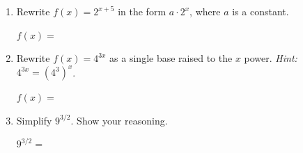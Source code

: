 \documentclass[10pt]{article}
\begin{document}
\namedateperiod

\vspace{0.12in}

\begin{enumerate}[itemsep=18pt]

\item Rewrite $f(x) = 2^{x+5}$ in the form $a \cdot 2^x$, where $a$ is a constant.

      \vspace{0.08in}
      $f(x) = $ \blank{7cm}

\item Rewrite $f(x) = 4^{3x}$ as a single base raised to the $x$ power.
      \textit{Hint: } $4^{3x} = (4^3)^x$.

      \vspace{0.08in}
      $f(x) = $ \blank{7cm}

\item Simplify $9^{3/2}$. Show your reasoning.

      \vspace{0.08in}
      $9^{3/2} = $ \blank{4cm}

\end{enumerate}
\end{document}
